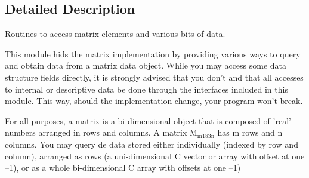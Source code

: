 \subsection{Detailed Description}
Routines to access matrix elements and various bits of data.



This module hids the matrix implementation by providing various ways to query and obtain data from a matrix data object. While you may access some data structure fields directly, it is strongly advised  that you don't and that all accesses to internal or descriptive data be done through the interfaces included in this module. This way, should the implementation change, your program won't break.

For all purposes, a matrix is a bi-dimensional object that is composed of 'real' numbers arranged in rows and columns. A matrix M$_{\mbox{m183n}}$ has m rows and n columns. You may query de data stored either individually (indexed by row and column), arranged as rows (a uni-dimensional C vector or array with offset at one --1), or as a whole bi-dimensional C array with offsets at one --1)

